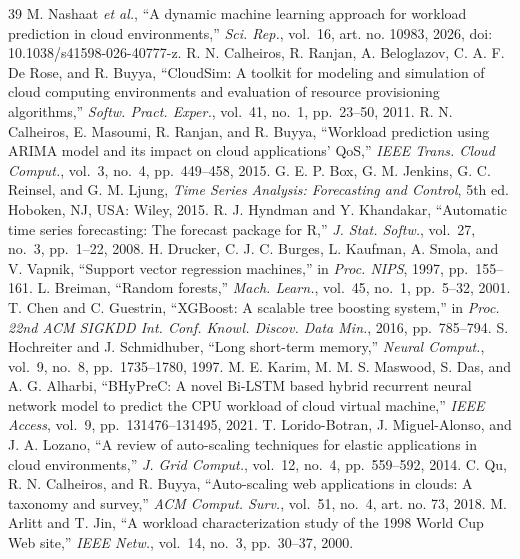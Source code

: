 \documentclass[journal,onecolumn,11pt]{IEEEtran}
\begin{document}
\begin{thebibliography}{39}
 M. Nashaat \emph{et al.}, ``A dynamic machine learning approach for workload prediction in cloud environments,'' \emph{Sci. Rep.}, vol.~16, art. no. 10983, 2026, doi: 10.1038/s41598-026-40777-z.
 R. N. Calheiros, R. Ranjan, A. Beloglazov, C. A. F. De Rose, and R. Buyya, ``CloudSim: A toolkit for modeling and simulation of cloud computing environments and evaluation of resource provisioning algorithms,'' \emph{Softw. Pract. Exper.}, vol.~41, no.~1, pp.~23--50, 2011.
 R. N. Calheiros, E. Masoumi, R. Ranjan, and R. Buyya, ``Workload prediction using ARIMA model and its impact on cloud applications' QoS,'' \emph{IEEE Trans. Cloud Comput.}, vol.~3, no.~4, pp.~449--458, 2015.
 G. E. P. Box, G. M. Jenkins, G. C. Reinsel, and G. M. Ljung, \emph{Time Series Analysis: Forecasting and Control}, 5th ed. Hoboken, NJ, USA: Wiley, 2015.
 R. J. Hyndman and Y. Khandakar, ``Automatic time series forecasting: The forecast package for R,'' \emph{J. Stat. Softw.}, vol.~27, no.~3, pp.~1--22, 2008.
 H. Drucker, C. J. C. Burges, L. Kaufman, A. Smola, and V. Vapnik, ``Support vector regression machines,'' in \emph{Proc. NIPS}, 1997, pp.~155--161.
 L. Breiman, ``Random forests,'' \emph{Mach. Learn.}, vol.~45, no.~1, pp.~5--32, 2001.
 T. Chen and C. Guestrin, ``XGBoost: A scalable tree boosting system,'' in \emph{Proc. 22nd ACM SIGKDD Int. Conf. Knowl. Discov. Data Min.}, 2016, pp.~785--794.
 S. Hochreiter and J. Schmidhuber, ``Long short-term memory,'' \emph{Neural Comput.}, vol.~9, no.~8, pp.~1735--1780, 1997.
 M. E. Karim, M. M. S. Maswood, S. Das, and A. G. Alharbi, ``BHyPreC: A novel Bi-LSTM based hybrid recurrent neural network model to predict the CPU workload of cloud virtual machine,'' \emph{IEEE Access}, vol.~9, pp.~131476--131495, 2021.
 T. Lorido-Botran, J. Miguel-Alonso, and J. A. Lozano, ``A review of auto-scaling techniques for elastic applications in cloud environments,'' \emph{J. Grid Comput.}, vol.~12, no.~4, pp.~559--592, 2014.
 C. Qu, R. N. Calheiros, and R. Buyya, ``Auto-scaling web applications in clouds: A taxonomy and survey,'' \emph{ACM Comput. Surv.}, vol.~51, no.~4, art. no. 73, 2018.
 M. Arlitt and T. Jin, ``A workload characterization study of the 1998 World Cup Web site,'' \emph{IEEE Netw.}, vol.~14, no.~3, pp.~30--37, 2000.

\end{thebibliography}
\end{document}
